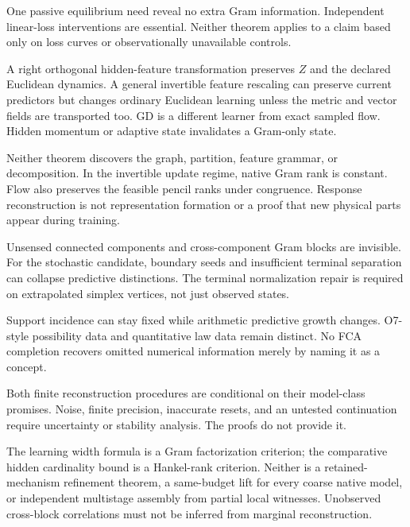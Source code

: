 \documentclass[11pt]{article}
\theoremstyle{remark}
\begin{document}
\begin{description}[style=nextline,leftmargin=0pt]
\item[Passive training and stationary loss]
One passive equilibrium need reveal no extra Gram information. Independent linear-loss interventions are essential. Neither theorem applies to a claim based only on loss curves or observationally unavailable controls.
\item[Coordinate and optimizer changes]
A right orthogonal hidden-feature transformation preserves $Z$ and the declared Euclidean dynamics. A general invertible feature rescaling can preserve current predictors but changes ordinary Euclidean learning unless the metric and vector fields are transported too. GD is a different learner from exact sampled flow. Hidden momentum or adaptive state invalidates a Gram-only state.
\item[Architecture and formation]
Neither theorem discovers the graph, partition, feature grammar, or decomposition. In the invertible update regime, native Gram rank is constant. Flow also preserves the feasible pencil ranks under congruence. Response reconstruction is not representation formation or a proof that new physical parts appear during training.
\item[Sensor and support boundaries]
Unsensed connected components and cross-component Gram blocks are invisible. For the stochastic candidate, boundary seeds and insufficient terminal separation can collapse predictive distinctions. The terminal normalization repair is required on extrapolated simplex vertices, not just observed states.
\item[Probability versus possibility]
Support incidence can stay fixed while arithmetic predictive growth changes. O7-style possibility data and quantitative law data remain distinct. No FCA completion recovers omitted numerical information merely by naming it as a concept.
\item[Finite evidence]
Both finite reconstruction procedures are conditional on their model-class promises. Noise, finite precision, inaccurate resets, and an untested continuation require uncertainty or stability analysis. The proofs do not provide it.
\item[Native and joint semantics]
The learning width formula is a Gram factorization criterion; the comparative hidden cardinality bound is a Hankel-rank criterion. Neither is a retained-mechanism refinement theorem, a same-budget lift for every coarse native model, or independent multistage assembly from partial local witnesses. Unobserved cross-block correlations must not be inferred from marginal reconstruction.

\end{description}
\end{document}
